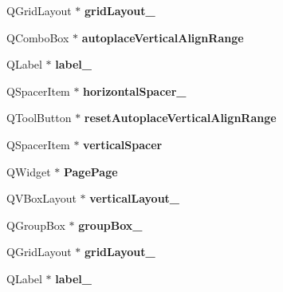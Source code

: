 \begin{DoxyCompactItemize}
Q\+Grid\+Layout $\ast$ {\bfseries grid\+Layout\+\_}
\item 
\mbox{\label{class_ui___edit_style_base_a9fa129f3e34ed428d637d05f221e122b}} 
Q\+Combo\+Box $\ast$ {\bfseries autoplace\+Vertical\+Align\+Range}
\item 
\mbox{\label{class_ui___edit_style_base_a3fcd072fa01d8265d0882f6820ba18fb}} 
Q\+Label $\ast$ {\bfseries label\+\_}
\item 
\mbox{\label{class_ui___edit_style_base_a27b915540d8257f66880c6b5e0bcd070}} 
Q\+Spacer\+Item $\ast$ {\bfseries horizontal\+Spacer\+\_}
\item 
\mbox{\label{class_ui___edit_style_base_a7b5e323594b58b4e63b45dc4efae18dd}} 
Q\+Tool\+Button $\ast$ {\bfseries reset\+Autoplace\+Vertical\+Align\+Range}
\item 
\mbox{\label{class_ui___edit_style_base_a7e2f5dba401e50ede53106052d3ba1fa}} 
Q\+Spacer\+Item $\ast$ {\bfseries vertical\+Spacer}
\item 
\mbox{\label{class_ui___edit_style_base_a2c368d54a1d4150dac3c631dd9e9338a}} 
Q\+Widget $\ast$ {\bfseries Page\+Page}
\item 
\mbox{\label{class_ui___edit_style_base_aa75c8f3cd83959b3db4226e65a7628ec}} 
Q\+V\+Box\+Layout $\ast$ {\bfseries vertical\+Layout\+\_}
\item 
\mbox{\label{class_ui___edit_style_base_a329b9d89d8b628c5a670a4f1941036fd}} 
Q\+Group\+Box $\ast$ {\bfseries group\+Box\+\_}
\item 
\mbox{\label{class_ui___edit_style_base_a62f183fa2438fdd4069be076a17198bb}} 
Q\+Grid\+Layout $\ast$ {\bfseries grid\+Layout\+\_}
\item 
\mbox{\label{class_ui___edit_style_base_aef6646ffe6bd746f09d3f44d895e3552}} 
Q\+Label $\ast$ {\bfseries label\+\_}
\item 

\end{DoxyCompactItemize}
